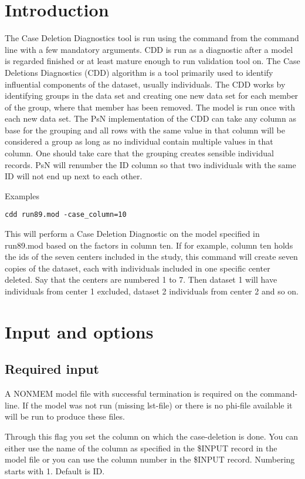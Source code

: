 



\maketitle
\newcommand{\guidetoolname}{cdd}

\section{Introduction}
The Case Deletion Diagnostics tool is run using the command from the command line with a few mandatory arguments. 
CDD is run as a diagnostic after a model is regarded finished or at least mature enough to run validation tool on. 
The Case Deletions Diagnostics (CDD) algorithm is a tool primarily used to identify influential components of the dataset, 
usually individuals. The CDD works by identifying groups in the data set and creating one new data set for each member 
of the group, where that member has been removed. The model is run once with each new data set. The PsN implementation 
of the CDD can take any column as base for the grouping and all rows with the same value in that column will be considered 
a group as long as no individual contain multiple values in that column. One should take care that the grouping creates sensible 
individual records. PsN will renumber the ID column so that two individuals with the same ID will not end up next to each other.

Examples
\begin{verbatim}
cdd run89.mod -case_column=10
\end{verbatim}
This will perform a Case Deletion Diagnostic on the model specified in run89.mod based on the factors in column ten. If for example, 
column ten holds the ids of the seven centers included in the study, this command will create seven copies of the dataset, each with 
individuals included in one specific center deleted. Say that the centers are numbered 1 to 7. Then dataset 1 will have individuals from 
center 1 excluded, dataset 2 individuals from center 2 and so on.

\section{Input and options}

\subsection{Required input}
A NONMEM model file with successful termination is required on the command-line. If the model was not run (missing lst-file) or there is no phi-file available it will be run to produce these files.
\begin{optionlist}
Through this flag you set the column on which the case-deletion is done. You can either use the name of the column as specified in the 
\mbox{\$INPUT} record in the model file or you can use the column number in the \mbox{\$INPUT} record. Numbering starts with 1. 
Default is ID.
\end{optionlist}

